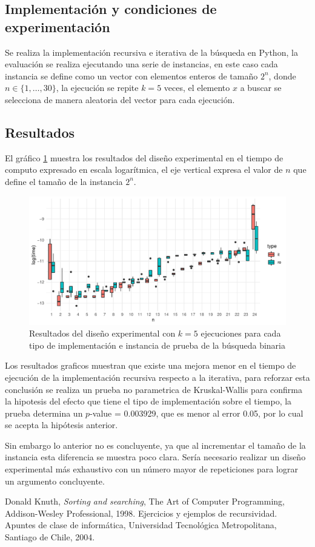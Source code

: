 \documentclass[letterpaper,11pt]{article}
\begin{document}
\subsection{Implementación y condiciones de experimentación}
Se realiza la implementación recursiva e iterativa de la búsqueda en Python, la evaluación se realiza ejecutando una serie de instancias, en este caso cada instancia se define como un vector con elementos enteros de tamaño ${2^n}$, donde $n\in \{1,\dots,30\}$, la ejecución se repite $k=5$ veces, el elemento $x$ a buscar se selecciona de manera aleatoria del vector para cada ejecución.

\subsection{Resultados}
El gráfico \ref{fig:bs} muestra los resultados del diseño experimental en el tiempo de computo expresado en escala logarítmica, el eje vertical expresa el valor de $n$ que define el tamaño de la instancia ${2^n}$. 

\begin{figure}[h]
 \centering
  \includegraphics[width=11.5cm]{bs.pdf}
  \caption{Resultados del diseño experimental con $k=5$ ejecuciones para cada tipo de implementación e instancia de prueba de la búsqueda binaria}
  \label{fig:bs}
\end{figure}

Los resultados graficos muestran que existe una mejora menor en el tiempo de ejecución de la implementación recursiva respecto a la iterativa, para reforzar esta conclusión se realiza un prueba no parametrica de Kruskal-Wallis para confirma la hipotesis del efecto que tiene el tipo de implementación sobre el tiempo, la prueba determina un $p$-value = 0.003929, que es menor al error 0.05, por lo cual se acepta la hipótesis anterior.

Sin embargo lo anterior no es concluyente, ya que al incrementar el tamaño de la instancia esta diferencia se muestra poco clara. Sería necesario realizar un diseño experimental más exhaustivo con un número mayor de repeticiones para lograr un argumento concluyente.

\begin{thebibliography}{0}
   Donald Knuth, \textit{Sorting and searching}, The Art of Computer Programming, Addison-Wesley Professional, 1998.
   Ejercicios y ejemplos de recursividad. Apuntes de clase de informática, Universidad Tecnológica Metropolitana, Santiago de Chile, 2004.
\end{thebibliography}
\end{document}
